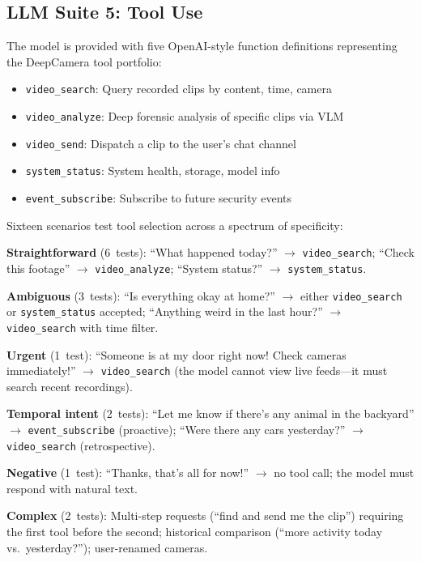 \documentclass[conference]{IEEEtran}
\begin{document}
\subsection{LLM Suite 5: Tool Use}

The model is provided with five OpenAI-style function definitions
representing the DeepCamera tool portfolio:

\begin{itemize}[nosep]
    \item \texttt{video\_search}: Query recorded clips by content, time,
    camera
    \item \texttt{video\_analyze}: Deep forensic analysis of specific
    clips via VLM
    \item \texttt{video\_send}: Dispatch a clip to the user's chat channel
    \item \texttt{system\_status}: System health, storage, model info
    \item \texttt{event\_subscribe}: Subscribe to future security events
\end{itemize}

Sixteen scenarios test tool selection across a spectrum of specificity:

\noindent\textbf{Straightforward} (6~tests): ``What happened today?''
$\rightarrow$ \texttt{video\_search}; ``Check this footage''
$\rightarrow$ \texttt{video\_analyze}; ``System status?''
$\rightarrow$ \texttt{system\_status}.

\noindent\textbf{Ambiguous} (3~tests): ``Is everything okay at home?''
$\rightarrow$ either \texttt{video\_search} or \texttt{system\_status}
accepted; ``Anything weird in the last hour?''
$\rightarrow$ \texttt{video\_search} with time filter.

\noindent\textbf{Urgent} (1~test): ``Someone is at my door right now!
Check cameras immediately!'' $\rightarrow$ \texttt{video\_search}
(the model cannot view live feeds---it must search recent recordings).

\noindent\textbf{Temporal intent} (2~tests): ``Let me know if there's
any animal in the backyard'' $\rightarrow$ \texttt{event\_subscribe}
(proactive); ``Were there any cars yesterday?'' $\rightarrow$
\texttt{video\_search} (retrospective).

\noindent\textbf{Negative} (1~test): ``Thanks, that's all for now!''
$\rightarrow$ no tool call; the model must respond with natural text.

\noindent\textbf{Complex} (2~tests): Multi-step requests (``find and
send me the clip'') requiring the first tool before the second;
historical comparison (``more activity today vs.\ yesterday?'');
user-renamed cameras.
\end{document}

